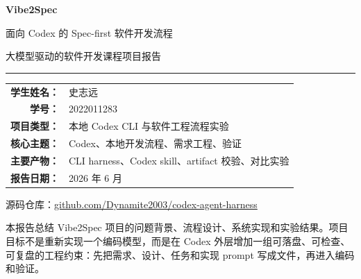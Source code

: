 \documentclass[11pt,a4paper]{article}
\newcommand{\important}[1]{\textbf{#1}}
\begin{document}
\begin{titlepage}
\thispagestyle{empty}
\centering
\vspace*{1.1cm}
{\Huge\bfseries Vibe2Spec\par}
\vspace{0.45cm}
{\LARGE 面向 Codex 的 Spec-first 软件开发流程\par}
\vspace{0.35cm}
{\Large 大模型驱动的软件开发课程项目报告\par}
\vspace{0.85cm}
{\color{reportblue}\rule{0.78\textwidth}{1.2pt}\par}
\vspace{1.0cm}
\begin{tabular}{rl}
\important{学生姓名：} & 史志远 \\
\important{学号：} & 2022011283 \\
\important{项目类型：} & 本地 Codex CLI 与软件工程流程实验 \\
\important{核心主题：} & Codex、本地开发流程、需求工程、验证 \\
\important{主要产物：} & CLI harness、Codex skill、artifact 校验、对比实验 \\
\important{报告日期：} & 2026 年 6 月 \\
\end{tabular}
\vspace{0.35cm}

{\small 源码仓库：\href{https://github.com/Dynamite2003/codex-agent-harness/tree/main}{github.com/Dynamite2003/codex-agent-harness}}\par
\vfill
\begin{minipage}{0.82\textwidth}
\small
本报告总结 Vibe2Spec 项目的问题背景、流程设计、系统实现和实验结果。项目目标不是重新实现一个编码模型，而是在 Codex 外层增加一组可落盘、可检查、可复盘的工程约束：先把需求、设计、任务和实现 prompt 写成文件，再进入编码和验证。
\end{minipage}
\end{titlepage}

\setcounter{page}{1}

\begin{abstract}
本项目围绕 Codex 本地开发流程做了一层 Spec-first 包装。具体做法是把一次开发目标拆成需求、设计、任务和实现 prompt 四类 artifact，再由 CLI harness 或 Codex skill 推进后续实现。完整 harness 会记录 prompt、上下文、命令、输出和状态，适合课程展示、失败复盘和过程审计；轻量 skill 直接在当前 Codex 会话中生成同类文档，适合日常开发。三组实验结果为：Todo deadline 任务中 Direct baseline 与 Vibe2Spec 均通过 16/16 功能探针；Sprint Board Lite 中二者核心功能接近，但 Vibe2Spec 保留了更完整的过程文件；订阅 proration 计费任务中 Direct baseline 通过 2/6，Vibe2Spec 通过 6/6。实验说明，这套流程的主要作用是把隐含规则提前写成需求、设计决策和验收 fixture，而不是增加代码生成步骤。
\end{abstract}
\end{document}
